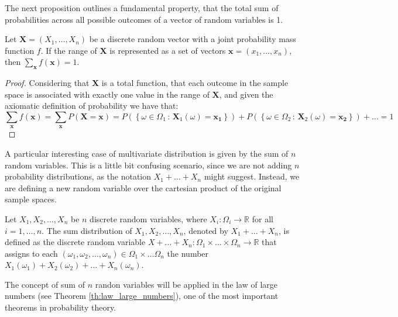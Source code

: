 The next proposition outlines a fundamental property, that the total sum of probabilities across all possible outcomes of a vector of random variables is 1.

\begin{proposition}
Let $\mathbf{X}=\left(X_{1}, \ldots, X_{n}\right)$ be a discrete random vector with a joint probability mass function $f$. If the range of $\mathbf{X}$ is represented as a set of vectors $\mathbf{x} = (x_{1}, \ldots, x_{n})$, then $\sum_{\mathbf{x}}f\left(\mathbf{x}\right)=1$.
\end{proposition}
\begin{proof}
Considering that $\mathbf{X}$ is a total function, that each outcome in the sample space is associated with exactly one value in the range of $\mathbf{X}$, and given the axiomatic definition of probability we have that:
\[
\sum_{\mathbf{x}} f(\mathbf{x}) = \sum_{\mathbf{x}} P\left( \mathbf{X} = \mathbf{x} \right) = P \left( \left\{ \omega \in \Omega_1 \,:\, \mathbf{X}_1(\omega) = \mathbf{x_1} \right\} \right) + P \left( \left\{ \omega \in \Omega_2 \,:\, \mathbf{X}_2(\omega) = \mathbf{x_2} \right\} \right) + \ldots = 1 
\]
\end{proof}

A particular interesting case of multivariate distribution is given by the sum of $n$ random variables. This is a little bit confusing scenario, since we are not adding $n$ probability distributions, as the notation $X_1 + \ldots + X_n$ might suggest. Instead, we are defining a new random variable over the cartesian product of the original sample spaces.

\begin{definition}
Let $X_1, X_2, \ldots, X_n$ be $n$ discrete random variables, where $X_i : \Omega_i \rightarrow \mathbb{R}$ for all $i=1, \ldots, n$. The sum distribution of $X_1, X_2, \ldots, X_n$, denoted by $X_1 + \ldots + X_n$, is defined as the discrete random variable $X + \ldots + X_n : \Omega_1 \times \ldots \times \Omega_n \rightarrow \mathbb{R}$ that assigns to each $\left( \omega_1, \omega_2, \ldots, \omega_n \right) \in \Omega_1 \times \ldots \Omega_n$ the number $X_1 \left( \omega_1 \right) + X_2 \left( \omega_2 \right) + \ldots + X_n \left( \omega_n \right)$.
\end{definition}

The concept of sum of $n$ randon variables will be applied in the law of large numbers (see Theorem \ref{th:law_large_numbers}), one of the most important theorems in probability theory.

